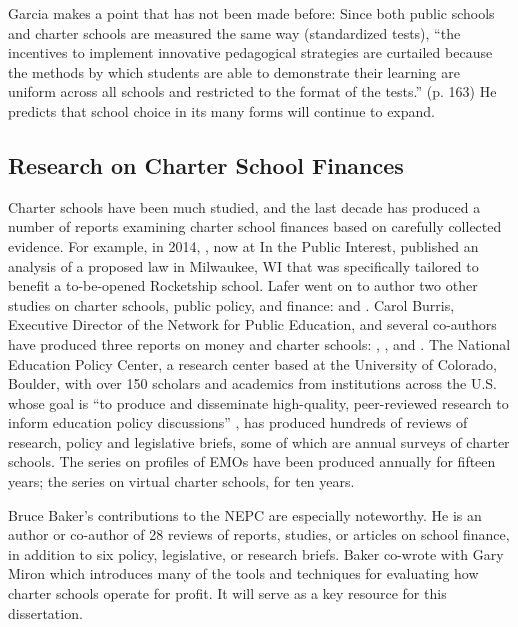 Garcia makes a point that has not been made before: Since both public schools and charter schools are measured the same way (standardized tests), ``the incentives to implement innovative pedagogical strategies are curtailed because the methods by which students are able to demonstrate their learning are uniform across all schools and restricted to the format of the tests.'' (p. 163) He predicts that school choice in its many forms will continue to expand. %

\subsection{Research on Charter School Finances}\label{sec:rese-chart-scho}\indent

Charter schools have been much studied, and the last decade has produced a number of reports examining charter school finances based on carefully collected evidence. For example, in 2014, \textcite{Lafer2014}, now at In the  Public Interest, published an analysis of a proposed law in Milwaukee, WI \parencite{Lafer2014} that was specifically tailored to benefit a to-be-opened Rocketship school. Lafer went on to author two other studies on charter schools, public policy, and finance:  \parencite{Lafer2017} and  \parencite{Lafer2018}. Carol Burris, Executive Director of the Network for Public Education, and several co-authors have produced three reports on money and charter schools: \textcite{Burris.Pfleger2020}, \textcite{Burris.Bryant2020}, and \textcite{Burris.Cimarusti2021}. The National Education Policy Center, a research center based at the University of Colorado, Boulder, with over 150 scholars and academics from institutions across the U.S. whose goal is ``to produce and disseminate high-quality, peer-reviewed research to inform education policy discussions'' \parencite{NEPC2021}, has produced hundreds of reviews of research, policy and legislative briefs, some of which are annual surveys of charter schools. The series on profiles of EMOs have been produced annually for fifteen years; the series on virtual charter schools, for ten years.

Bruce Baker's contributions to the NEPC are especially noteworthy. He is an author or co-author of 28 reviews of reports, studies, or articles on school finance, in addition to six policy, legislative, or research briefs. Baker co-wrote with Gary Miron  \parencite{Baker.Miron2015} which introduces many of the tools and techniques for evaluating how charter schools operate for profit. It will serve as a key resource for this dissertation.

